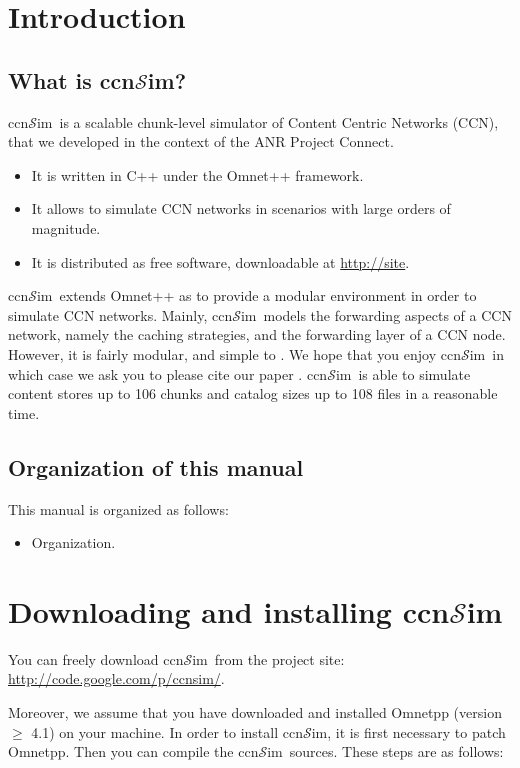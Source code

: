 \documentclass{article}
\newcommand{\ccnsim}{ccn$\mathcal{S}$im}
\begin{document}
\tableofcontents
\newpage
\section{Introduction}
\subsection{What is \ccnsim?}
\ccnsim\ is a scalable chunk-level simulator of Content Centric Networks (CCN)\cite{jacobson09conext}, that we developed in the context of the ANR Project Connect.  

\begin{itemize}
    \item It is written in C++ under the Omnet++ framework.
    \item It  allows to simulate CCN networks in scenarios with large orders of magnitude.
    \item It is distributed as free software, downloadable at \url{http://site}.
\end{itemize}
\ccnsim\ extends Omnet++ as to provide a modular environment in order to simulate CCN networks. Mainly,  \ccnsim\ models the forwarding aspects of a CCN network, namely the caching strategies, and the forwarding layer of a CCN node. However, it is fairly modular, and simple to . We hope that you enjoy \ccnsim\, in which case we ask you to please cite our paper \cite{ccn12icc}. 
\ccnsim\ is able to simulate content stores up to 106 chunks and catalog sizes up to 108 files in a reasonable time.  
\subsection{Organization of this manual}
This manual is organized as follows:
\begin{itemize}
    \item Organization.
\end{itemize}


\section{Downloading and installing \ccnsim}
You can freely download \ccnsim\ from the project site: \url{http://code.google.com/p/ccnsim/}. 

Moreover, we assume that you have downloaded and installed Omnetpp (version $\geq$ 4.1) on your machine. In order to install \ccnsim, it is first necessary to patch Omnetpp. Then you can compile the \ccnsim\ sources. These steps are as follows:
\end{document}
